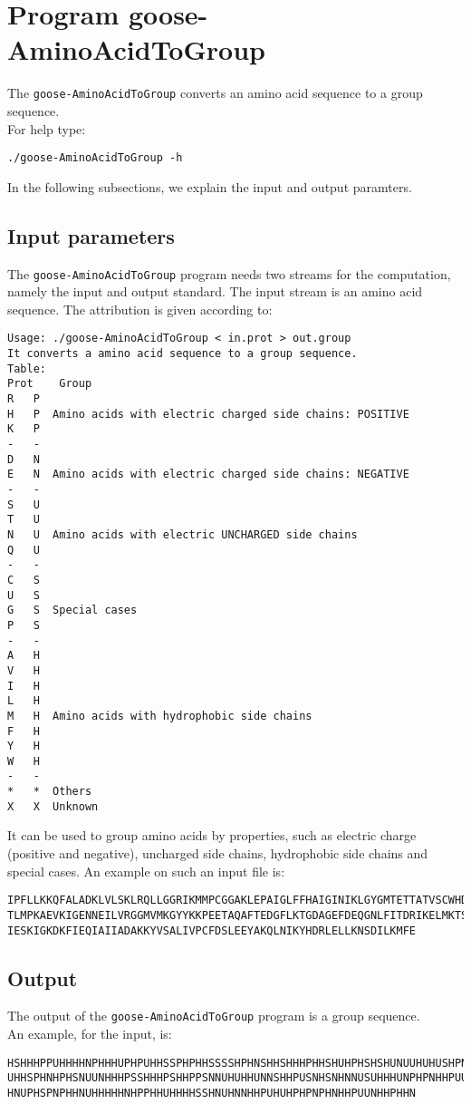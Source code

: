 \section{Program goose-AminoAcidToGroup}

The \texttt{goose-AminoAcidToGroup} converts an amino acid sequence to a group 
sequence.\\
For help type:
\begin{lstlisting}
./goose-AminoAcidToGroup -h
\end{lstlisting}
In the following subsections, we explain the input and output paramters.

\subsection{Input parameters}

The \texttt{goose-AminoAcidToGroup} program needs two streams for the computation,
namely the input and output standard. The input stream is an amino acid sequence.
The attribution is given according to:
\begin{lstlisting}
Usage: ./goose-AminoAcidToGroup < in.prot > out.group
It converts a amino acid sequence to a group sequence.
Table:
Prot	Group
R	P
H	P  Amino acids with electric charged side chains: POSITIVE
K	P
-	-
D	N
E	N  Amino acids with electric charged side chains: NEGATIVE
-	-
S	U
T	U
N	U  Amino acids with electric UNCHARGED side chains
Q	U
-	-
C	S
U	S
G	S  Special cases
P	S
-	-
A	H
V	H
I	H
L	H
M	H  Amino acids with hydrophobic side chains
F	H
Y	H
W	H
-	-
*	*  Others
X	X  Unknown
\end{lstlisting}
It can be used to group amino acids by properties, such as electric charge (positive
and negative), uncharged side chains, hydrophobic side chains and special cases.
An example on such an input file is:
\begin{lstlisting}
IPFLLKKQFALADKLVLSKLRQLLGGRIKMMPCGGAKLEPAIGLFFHAIGINIKLGYGMTETTATVSCWHDFQFNPNSIG
TLMPKAEVKIGENNEILVRGGMVMKGYYKKPEETAQAFTEDGFLKTGDAGEFDEQGNLFITDRIKELMKTSNGKYIAPQY
IESKIGKDKFIEQIAIIADAKKYVSALIVPCFDSLEEYAKQLNIKYHDRLELLKNSDILKMFE
\end{lstlisting}

\subsection{Output}

The output of the \texttt{goose-AminoAcidToGroup} program is a group sequence.\\
An example, for the input, is:
\begin{lstlisting}
HSHHHPPUHHHHNPHHHUPHPUHHSSPHPHHSSSSHPHNSHHSHHHPHHSHUHPHSHSHUNUUHUHUSHPNHUHUSUUHS
UHHSPHNHPHSNUUNHHHPSSHHHPSHHPPSNNUHUHHUNNSHHPUSNHSNHNNUSUHHHUNPHPNHHPUUUSPHHHSUH
HNUPHSPNPHHNUHHHHHNHPPHHUHHHHSSHNUHNNHHPUHUHPHPNPHNHHPUUNHHPHHN
\end{lstlisting}
